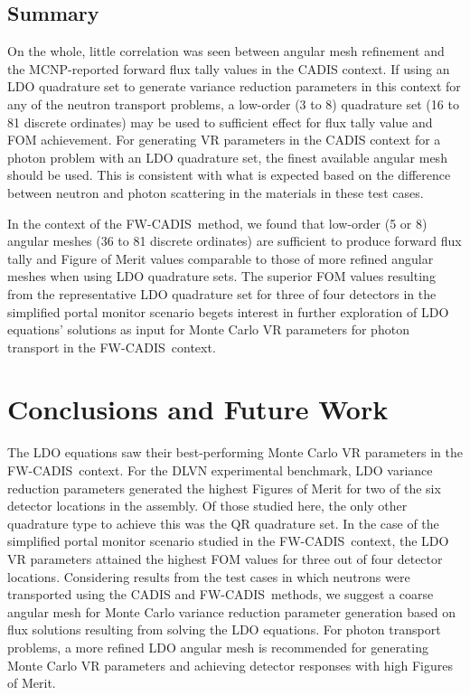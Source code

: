 \documentclass{article} %
\newcommand{\fwc}{\mbox{FW-CADIS}}
\begin{document}
\subsection{Summary}

On the whole, little correlation was seen between angular mesh refinement and
the MCNP-reported forward flux tally values in the CADIS context. If using an
LDO quadrature set to generate variance reduction parameters in this context
for any of the neutron transport problems, a low-order (3 to 8) quadrature
set (16 to 81 discrete ordinates) may be used to sufficient effect for flux
tally value and FOM achievement. For generating VR parameters in the CADIS
context for a photon problem with an LDO quadrature set, the finest available
angular mesh should be used. This is consistent with what is expected based on
the difference between neutron and photon scattering in the materials in these
test cases.

In the context of the \fwc\ method, we found that low-order (5 or 8) angular
meshes (36 to 81 discrete ordinates) are sufficient to produce forward flux
tally and Figure of Merit values comparable to those of more refined angular
meshes when using LDO quadrature sets. The superior FOM values resulting from
the representative LDO quadrature set for three of four detectors in the
simplified portal monitor scenario begets interest in further exploration of
LDO equations' solutions as input for Monte Carlo VR parameters for photon
transport in the \fwc\ context.

\section{Conclusions and Future Work}
\label{sec:conclusions}

The LDO equations saw their best-performing Monte Carlo VR parameters in
the \fwc\ context. For the DLVN experimental benchmark, LDO variance reduction
parameters generated the highest Figures of Merit for two of the six detector
locations in the assembly. Of those studied here, the only other quadrature
type to achieve this was the QR quadrature set. In the case of the simplified
portal monitor scenario studied in the \fwc\ context, the LDO VR
parameters attained the highest FOM values for three out of four detector
locations. Considering results from the test cases in which neutrons
were transported using the CADIS and \fwc\ methods, we suggest a coarse
angular mesh for Monte Carlo variance reduction parameter generation based on
flux solutions resulting from solving the LDO equations. For photon transport
problems, a more refined LDO angular mesh is recommended for generating Monte
Carlo VR parameters and achieving detector responses with high Figures of
Merit.
\end{document}
